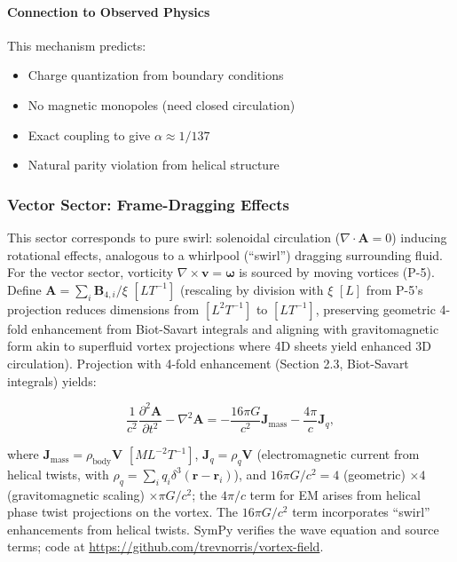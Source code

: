 \paragraph{Connection to Observed Physics}

This mechanism predicts:
\begin{itemize}
\item Charge quantization from boundary conditions
\item No magnetic monopoles (need closed circulation)
\item Exact coupling to give $\alpha \approx 1/137$
\item Natural parity violation from helical structure
\end{itemize}

\subsubsection{Vector Sector: Frame-Dragging Effects}

This sector corresponds to pure swirl: solenoidal circulation ($\nabla \cdot \mathbf{A} = 0$) inducing rotational effects, analogous to a whirlpool (``swirl'') dragging surrounding fluid. For the vector sector, vorticity $\nabla \times \mathbf{v} = \boldsymbol{\omega}$ is sourced by moving vortices (P-5). Define $\mathbf{A} = \sum_i \mathbf{B}_{4,i} / \xi$ $[L T^{-1}]$ (rescaling by division with $\xi$ $[L]$ from P-5's projection reduces dimensions from $[L^2 T^{-1}]$ to $[L T^{-1}]$, preserving geometric 4-fold enhancement from Biot-Savart integrals and aligning with gravitomagnetic form akin to superfluid vortex projections where 4D sheets yield enhanced 3D circulation). Projection with 4-fold enhancement (Section 2.3, Biot-Savart integrals) yields:

\begin{equation}
\frac{1}{c^2} \frac{\partial^2 \mathbf{A}}{\partial t^2} - \nabla^2 \mathbf{A} = -\frac{16\pi G}{c^2} \mathbf{J}_{\text{mass}} - \frac{4\pi}{c} \mathbf{J}_q,
\end{equation}

where $\mathbf{J}_{\text{mass}} = \rho_{\text{body}} \mathbf{V}$ $[M L^{-2} T^{-1}]$, $\mathbf{J}_q = \rho_q \mathbf{V}$ (electromagnetic current from helical twists, with $\rho_q = \sum_i q_i \delta^3(\mathbf{r} - \mathbf{r}_i)$), and $16\pi G/c^2 = 4$ (geometric) $\times 4$ (gravitomagnetic scaling) $\times \pi G/c^2$; the $4\pi/c$ term for EM arises from helical phase twist projections on the vortex. The $16\pi G/c^2$ term incorporates ``swirl'' enhancements from helical twists. SymPy verifies the wave equation and source terms; code at \url{https://github.com/trevnorris/vortex-field}.

